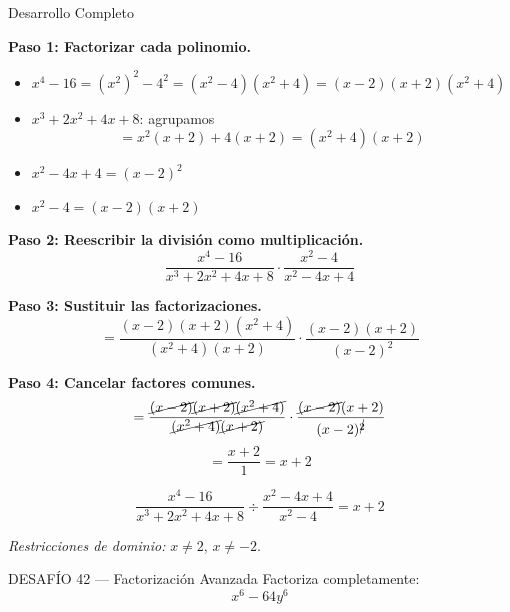 \documentclass[letterpaper, 12pt]{article}
\begin{document}
\begin{solucionbox}{Desarrollo Completo}

\textbf{Paso 1: Factorizar cada polinomio.}

\begin{itemize}[leftmargin=*, itemsep=0.3cm]
    \item $x^4 - 16 = (x^2)^2 - 4^2 = (x^2 - 4)(x^2 + 4) = (x-2)(x+2)(x^2+4)$

    \item $x^3 + 2x^2 + 4x + 8$: agrupamos
    \[
        = x^2(x + 2) + 4(x + 2) = (x^2 + 4)(x + 2)
    \]

    \item $x^2 - 4x + 4 = (x - 2)^2$

    \item $x^2 - 4 = (x - 2)(x + 2)$
\end{itemize}

\textbf{Paso 2: Reescribir la división como multiplicación.}
\[
    \frac{x^4 - 16}{x^3 + 2x^2 + 4x + 8} \cdot \frac{x^2 - 4}{x^2 - 4x + 4}
\]

\textbf{Paso 3: Sustituir las factorizaciones.}
\[
    = \frac{(x-2)(x+2)(x^2+4)}{(x^2+4)(x+2)} \cdot \frac{(x-2)(x+2)}{(x-2)^2}
\]

\textbf{Paso 4: Cancelar factores comunes.}
\[
    = \frac{\cancel{(x-2)}\cancel{(x+2)}\cancel{(x^2+4)}}{\cancel{(x^2+4)}\cancel{(x+2)}} \cdot \frac{\cancel{(x-2)}(x+2)}{(x-2)^{\cancel{2}}}
\]
\[
    = \frac{x + 2}{1} = x + 2
\]

\[\boxed{\frac{x^4 - 16}{x^3 + 2x^2 + 4x + 8} \div \frac{x^2 - 4x + 4}{x^2 - 4} = x + 2}\]

\textit{Restricciones de dominio:} $x \neq 2$, $x \neq -2$.
\end{solucionbox}

\newpage

\begin{desafiobox}{DESAFÍO 42 — Factorización Avanzada}
Factoriza completamente:
\[
    x^6 - 64y^6
\]
\end{desafiobox}
\end{document}
